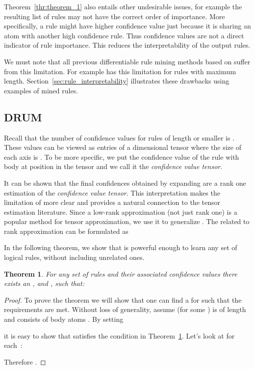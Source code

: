 \documentclass{article}
\newtheorem{theorem}{Theorem}
\begin{document}
Theorem~\ref{thr:theorem_1} also entails other undesirable issues, for example the resulting list of rules may not have the correct order of importance. More specifically, a rule might have higher confidence value just because it is sharing an atom with another high confidence rule. Thus confidence values are not a direct indicator of rule importance. This reduces the interpretability of the output rules.

We must note that all previous differentiable rule mining methods based on  suffer from this limitation. For example \citet{yang2017differentiable} has this limitation for rules with maximum length. Section~\ref{sec:rule_interpretability} illustrates these drawbacks using examples of mined rules.

\subsection{DRUM}
\label{sec:DRUM}

Recall that the number of confidence values for rules of length  or smaller is . These values can be viewed as entries of a  dimensional tensor where the size of each axis is . To be more specific, we put the confidence value of the rule with body  at position  in the tensor and we call it the \textit{confidence value tensor}. 

It can be shown that the final confidences obtained by expanding  are a rank one estimation of the \textit{confidence value tensor}. This interpretation makes the limitation of  more clear and provides a natural connection to the tensor estimation literature. Since a low-rank approximation (not just rank one) is a popular method for tensor approximation, we use it to generalize . The  related to rank  approximation can be formulated as


In the following theorem, we show that  is powerful enough to learn any set of logical rules, without including unrelated ones.

\begin{theorem}
\label{thr:theorem_2}
For any set of rules  and their associated confidence values  there exists an , and , such that:

\end{theorem}
\begin{proof}
To prove the theorem we will show that one can find a  for  such that the requirements are met. Without loss of generality, assume  (for some ) is of length  and consists of body atoms . By setting  

it is easy to show that  satisfies the condition in Theorem~\ref{thr:theorem_2}. Let's look at  for each~:

Therefore .
\end{proof}
\end{document}
